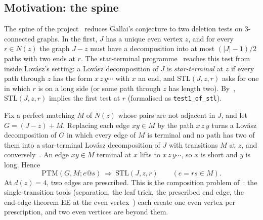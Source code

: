 \documentclass[11pt]{amsart}
\theoremstyle{definition}
\newcommand{\PTM}{\mathrm{PTM}}
\newcommand{\STL}{\mathrm{STL}}
\begin{document}
\subsection*{Motivation: the spine}
The spine of the project~\cite{SP} reduces Gallai's conjecture to two deletion tests on
$3$-connected graphs. In the first, $J$ has a unique even vertex $z$, and for every $r\in N(z)$
the graph $J-z$ must have a decomposition into at most $(|J|-1)/2$ paths with two ends at $r$.
The star-terminal programme~\cite{STL} reaches this test from inside Lov\'asz's setting: a
Lov\'asz decomposition of $J$ is \emph{star-terminal} at $z$ if every path through $z$ has the
form $x\,z\,y\cdots$ with $x$ an end, and $\STL(J,z,r)$ asks for one in which $r$ is on a long
side (or some path through $z$ has length two). By~\cite[Theorem~3.2]{STL}, $\STL(J,z,r)$
implies the first test at $r$ (formalised as \texttt{test1\_of\_stl}).

Fix a perfect matching $M$ of $N(z)$ whose pairs are not adjacent in $J$, and let
$G=(J-z)+M$. Replacing each edge $xy\in M$ by the path $x\,z\,y$ turns a Lov\'asz decomposition
of $G$ in which every edge of $M$ is terminal and no path has two of them into a star-terminal
Lov\'asz decomposition of $J$ with transitions $M$ at $z$, and conversely~\cite[Proposition~4.4]{STL}.
An edge $xy\in M$ terminal at $x$ lifts to $x\,z\,y\cdots$, so $x$ is short and $y$ is long. Hence
\[
\PTM(G,M;e@s)\ \Longrightarrow\ \STL(J,z,r)\qquad(e=rs\in M).
\]
At $d(z)=4$, two edges are prescribed. This is the composition problem of~\cite[\S X.4a]{CONN}:
the single-transition tools (separation, the leaf trick, the prescribed end edge, the end-edge
theorem EE at the even vertex~\cite{PE}) each create one even vertex per prescription, and two
even vertices are beyond them.
\end{document}
